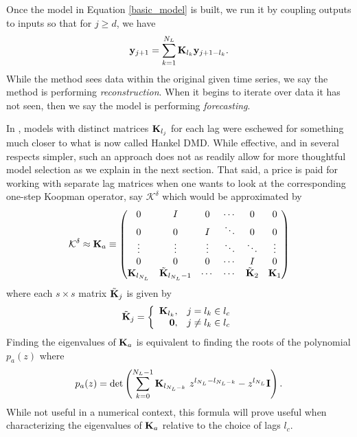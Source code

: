 \documentclass[a4paper,11pt]{article}
\newcommand{\ba}{\begin{array}}
\newcommand{\ea}{\end{array}}
\begin{document}
Once the model in Equation \eqref{basic_model} is built, we run it by coupling outputs to inputs so that for $j\geq d$, we have 
\begin{equation}
{\bf y}_{j+1} = \sum_{k=1}^{N_{L}}{\bf K}_{l_{k}}{\bf y}_{j+1-l_{k}}.  
\label{iterator}
\end{equation}
While the method sees data within the original given time series, we say the method is performing {\it reconstruction}.  When it begins to iterate over data it has not seen, then we say the model is performing {\it forecasting}. 

In \cite{clainche}, models with distinct matrices ${\bf K}_{l_{j}}$ for each lag were eschewed for something much closer to what is now called Hankel DMD.  While effective, and in several respects simpler, such an approach does not as readily allow for more thoughtful model selection as we explain in the next section.  That said, a price is paid for working with separate lag matrices when one wants to look at the corresponding one-step Koopman operator, say $\mathcal{K}^{\delta}$ which would be approximated by
\begin{equation}
\mathcal{K}^{\delta} \approx {\bf K}_{a} \equiv 
\begin{pmatrix} 
0 & I & 0 & \cdots & 0 & 0 \\ 
0 & 0 & I & \ddots & 0 & 0 \\ 
\vdots & \vdots & \vdots & \ddots & \ddots & \vdots \\
0 & 0 & 0 & \cdots & I & 0 \\
{\bf K}_{l_{N_{L}}} & \tilde{{\bf K}}_{l_{N_{L}}-1} & \cdots & \cdots & \tilde{{\bf K}}_{2} & {\bf K}_{1} 
\end{pmatrix}
\label{full_matrix}
\end{equation}
where each $s\times s$ matrix $\tilde{{\bf K}}_{j}$ is given by 
\[
\tilde{{\bf K}}_{j} = \left\{
\ba{rl}  
{\bf K}_{l_{k}}, & j=l_{k}\in l_{c}\\
{\bf 0}, & j\neq l_{k}\in l_{c}
\ea
\right.
\]
Finding the eigenvalues of ${\bf K}_{a}$ is equivalent to finding the roots of the polynomial $p_{a}(z)$ where 
\begin{equation}
p_{a}(z) = \text{det}\left(\sum_{k=0}^{N_{L}-1}{\bf K}_{l_{N_{L}-k}}~z^{l_{N_{L}}-l_{N_{L}-k}} - z^{l_{N_{L}}}{\bf I} \right). 
\label{characpoly}
\end{equation}
While not useful in a numerical context, this formula will prove useful when characterizing the eigenvalues of ${\bf K}_{a}$ relative to the choice of lags $l_{c}$.  
\end{document}
